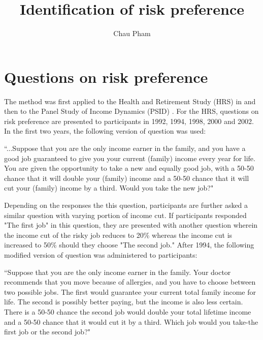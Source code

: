 \documentclass[]{article}
\title{Identification of risk preference}
\author{Chau Pham}
\begin{document}
\onehalfspacing
\maketitle

\section{Questions on risk preference}
The method was first applied to the Health and Retirement Study (HRS) in \citet{barsky1997preference} and \citet{kimball2008imputing} then to the Panel Study of Income Dynamics (PSID) \citep{kimball2009risk}. For the HRS, questions on risk preference are presented to participants in 1992, 1994, 1998, 2000 and 2002. In the first two years, the following version of question was used:

\begin{center}
	\begin{minipage}[!h]{.9\linewidth}\small
		``...Suppose that you are the only income earner in the family, and you have a good job guaranteed to give you your current (family) income every year for life. You are given the opportunity to take a new and equally good job, with a 50-50 chance that it will double your (family) income and a 50-50 chance that it will cut your (family) income by a third. Would you take the new job?"
	\end{minipage}
\end{center}
Depending on the responses the this question, participants are further asked a similar question with varying portion of income cut. If participants responded "The first job" in this question, they are presented with another question wherein the income cut of the risky job reduces to 20\% whereas the income cut is increased to 50\% should they choose "The second job." After 1994, the following modified version of question was administered to participants:
\begin{center}
	\begin{minipage}[!h]{.9\linewidth}\small
		``Suppose that you are the only income earner in the family. Your doctor recommends that you move because of allergies, and you have to choose between two possible jobs. The first would guarantee your current total family income for life. The second is possibly better paying, but the income is also less certain. There is a 50-50 chance the second job would double your total lifetime income and a 50-50 chance that it would cut it by a third. Which job would you take-the first job or the second job?"
	\end{minipage}
\end{center}
\end{document}

